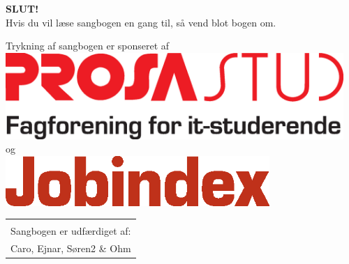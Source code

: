 \newpage
\pagestyle{empty}
\begin{center}
{\Huge \textbf{SLUT!}}\\
\vspace{4.5cm}
{\large Hvis du vil læse sangbogen en gang til, så vend blot bogen
  om.}\\

\vspace{2.5cm}

{\large Trykning af sangbogen er sponseret af \vspace{0.5cm}} \\
\includegraphics[width=0.96\textwidth]{res/prosalogo.eps} \\
\vspace{0.5cm}
og \\
\vspace{0.5cm}
\includegraphics[width=0.75\textwidth]{res/jobindex_logoKUN.eps}


\begin{tabular}{c}
\vspace{3cm}
\\
Sangbogen er udfærdiget af:\\
Caro, Ejnar, Søren2 \& Ohm
\end{tabular}
\end{center}
